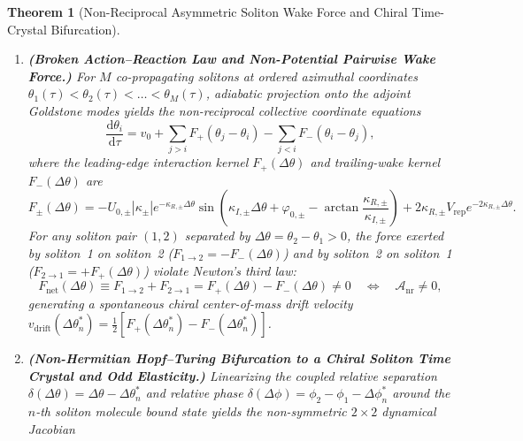 \documentclass[11pt,letterpaper]{article}
\newtheorem{theorem}{Theorem}
\begin{document}
\begin{theorem}[Non-Reciprocal Asymmetric Soliton Wake Force and Chiral Time-Crystal Bifurcation]
\begin{enumerate}
    \begin{equation}
    \mathcal{A}_{\mathrm{nr}} \equiv \frac{\kappa_{R,+} - \kappa_{R,-}}{\kappa_{R,+} + \kappa_{R,-}} \in (-1, 1).
    \label{eq:thm1_Anr}
    \end{equation}
    \item[(b)] \textbf{(Broken Action--Reaction Law and Non-Potential Pairwise Wake Force.)} For $M$ co-propagating solitons at ordered azimuthal coordinates $\theta_1(\tau) < \theta_2(\tau) < \dots < \theta_M(\tau)$, adiabatic projection onto the adjoint Goldstone modes yields the non-reciprocal collective coordinate equations
    \begin{equation}
    \frac{\mathrm{d}\theta_i}{\mathrm{d}\tau} = v_0 + \sum_{j > i} F_+\!\left(\theta_j - \theta_i\right) - \sum_{j < i} F_-\!\left(\theta_i - \theta_j\right),
    \label{eq:thm1_eom}
    \end{equation}
    where the leading-edge interaction kernel $F_+(\Delta\theta)$ and trailing-wake kernel $F_-(\Delta\theta)$ are
    \begin{equation}
    F_\pm(\Delta\theta) = -U_{0,\pm}|\kappa_\pm| e^{-\kappa_{R,\pm}\Delta\theta}\sin\!\left(\kappa_{I,\pm}\Delta\theta + \varphi_{0,\pm} - \arctan\frac{\kappa_{R,\pm}}{\kappa_{I,\pm}}\right) + 2\kappa_{R,\pm}V_{\mathrm{rep}}e^{-2\kappa_{R,\pm}\Delta\theta}.
    \label{eq:thm1_Fpm}
    \end{equation}
    For any soliton pair $(1, 2)$ separated by $\Delta\theta = \theta_2 - \theta_1 > 0$, the force exerted by soliton~1 on soliton~2 ($F_{1\to 2} = -F_-(\Delta\theta)$) and by soliton~2 on soliton~1 ($F_{2\to 1} = +F_+(\Delta\theta)$) violate Newton's third law:
    \begin{equation}
    F_{\mathrm{net}}(\Delta\theta) \equiv F_{1\to 2} + F_{2\to 1} = F_+(\Delta\theta) - F_-(\Delta\theta) \neq 0 \quad \Longleftrightarrow \quad \mathcal{A}_{\mathrm{nr}} \neq 0,
    \label{eq:thm1_broken_newton}
    \end{equation}
    generating a spontaneous chiral center-of-mass drift velocity $v_{\mathrm{drift}}(\Delta\theta_n^*) = \frac{1}{2}[F_+(\Delta\theta_n^*) - F_-(\Delta\theta_n^*)]$.
    \item[(c)] \textbf{(Non-Hermitian Hopf--Turing Bifurcation to a Chiral Soliton Time Crystal and Odd Elasticity.)} Linearizing the coupled relative separation $\delta(\Delta\theta) = \Delta\theta - \Delta\theta_n^*$ and relative phase $\delta(\Delta\phi) = \phi_2 - \phi_1 - \Delta\phi_n^*$ around the $n$-th soliton molecule bound state yields the non-symmetric $2\times 2$ dynamical Jacobian

\end{enumerate}
\end{theorem}
\end{document}
